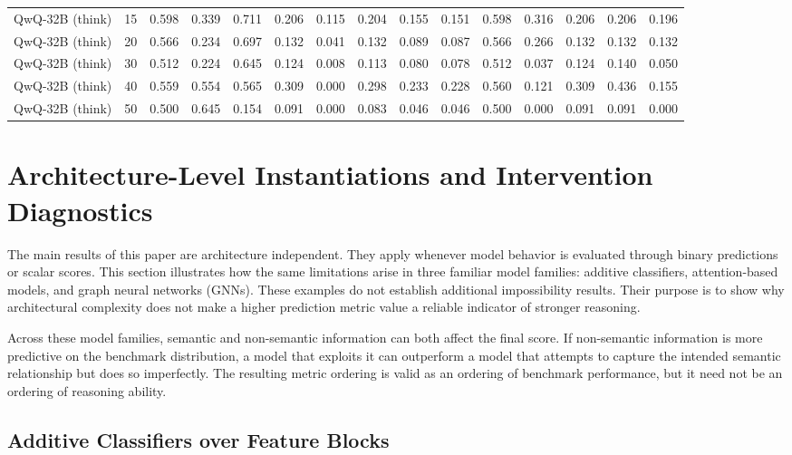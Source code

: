 \documentclass[acmsmall,screen,review,anonymous]{acmart}
\begin{document}
\begin{landscape}
\begin{longtable}{p{4.1cm}r*{13}{r}}
QwQ-32B (think) & 15 & 0.598 & 0.339 & 0.711 & 0.206 & 0.115 & 0.204 & 0.155 & 0.151 & 0.598 & 0.316 & 0.206 & 0.206 & 0.196 \\
QwQ-32B (think) & 20 & 0.566 & 0.234 & 0.697 & 0.132 & 0.041 & 0.132 & 0.089 & 0.087 & 0.566 & 0.266 & 0.132 & 0.132 & 0.132 \\
QwQ-32B (think) & 30 & 0.512 & 0.224 & 0.645 & 0.124 & 0.008 & 0.113 & 0.080 & 0.078 & 0.512 & 0.037 & 0.124 & 0.140 & 0.050 \\
QwQ-32B (think) & 40 & 0.559 & 0.554 & 0.565 & 0.309 & 0.000 & 0.298 & 0.233 & 0.228 & 0.560 & 0.121 & 0.309 & 0.436 & 0.155 \\
QwQ-32B (think) & 50 & 0.500 & 0.645 & 0.154 & 0.091 & 0.000 & 0.083 & 0.046 & 0.046 & 0.500 & 0.000 & 0.091 & 0.091 & 0.000 \\
\end{longtable}
\end{landscape}

\section{Architecture-Level Instantiations and Intervention Diagnostics}
\label{sec:supp-model-instantiations}

The main results of this paper are architecture independent. They apply
whenever model behavior is evaluated through binary predictions or scalar
scores. This section illustrates how the same limitations arise in three
familiar model families: additive classifiers, attention-based models, and
graph neural networks (GNNs). These examples do not establish additional
impossibility results. Their purpose is to show why architectural complexity
does not make a higher prediction metric value a reliable indicator of
stronger reasoning.

Across these model families, semantic and non-semantic information can both
affect the final score. If non-semantic information is more predictive on the
benchmark distribution, a model that exploits it can outperform a model that
attempts to capture the intended semantic relationship but does so
imperfectly. The resulting metric ordering is valid as an ordering of
benchmark performance, but it need not be an ordering of reasoning ability.

\subsection{Additive Classifiers over Feature Blocks}
\label{sec:supp-additive-instantiation}
\end{document}
